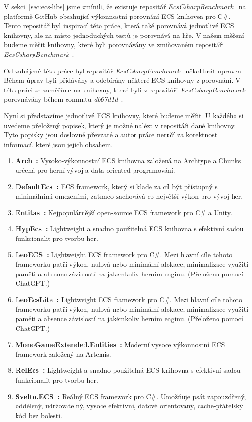 V sekci~\ref{sec:ecs-libs} jsme zmínili, že existuje repositář \textit{EcsCsharpBenchmark}~\cite{EcsCsharpBenchmark} na platformě GitHub obsahující výkonnostní porovnání ECS knihoven pro C\#. Tento repositář byl inspirací této práce, která také porovnává jednotlivé ECS knihovny, ale na místo jednoduchých testů je porovnává na hře. V našem měření budeme měřit knihovny, které byli porovnávány ve zmiňovaném repositáři \textit{EcsCsharpBenchmark}~\cite{EcsCsharpBenchmark}.

Od zahájené této práce byl repositář \textit{EcsCsharpBenchmark}~\cite{EcsCsharpBenchmark} několikrát upraven. Během úprav byli přidávány a odebírány některé ECS knihovny z porovnání. V této práci se zaměříme na knihovny, které byli v repositáři \textit{EcsCsharpBenchmark}~\cite{EcsCsharpBenchmark} porovnávány během commitu \textit{db67d1d}~\cite{EcsCsharpBenchmarkCommit}.

Nyní si představíme jednotlivé ECS knihovny, které budeme měřit. U každého si uvedeme přeložený popisek, který je možné nalézt v repositáři dané knihovny. Tyto popisky jsou doslovně převzaté a autor práce neručí za korektnost informací, které jsou jejich obsahem.

\begin{enumerate}
    \item \textbf{Arch~\cite{Arch}:} Vysoko-výkonnostní ECS knihovna založená na Archtype a Chunks určená pro herní vývoj a data-oriented programování.
    \item \textbf{DefaultEcs~\cite{DefaultEcs}:} ECS framework, který si klade za cíl být přístupný s minimálními omezeními, zatímco zachovává co největší výkon pro vývoj her.
    \item \textbf{Entitas~\cite{Entitas}:} Nejpopulárnější open-source ECS framework pro C\# a Unity.
    \item \textbf{HypEcs~\cite{HypEcs}:} Lightweight a snadno použitelná ECS knihovna s efektivní sadou funkcionalit pro tvorbu her.
    \item \textbf{LeoECS~\cite{LeoECS}:} Lightweight ECS framework pro C\#. Mezi hlavní cíle tohoto frameworku patří výkon, nulová nebo minimální alokace, minimalizace využití paměti a absence závislostí na jakémkoliv herním enginu. (Přeloženo pomocí ChatGPT.)
    \item \textbf{LeoEcsLite~\cite{LeoEcsLite}:} Lightweight ECS framework pro C\#. Mezi hlavní cíle tohoto frameworku patří výkon, nulová nebo minimální alokace, minimalizace využití paměti a absence závislostí na jakémkoliv herním enginu. (Přeloženo pomocí ChatGPT.)
    \item \textbf{MonoGameExtended.Entities~\cite{MonoGameExtended}:} Moderní vysoce výkonnostní ECS framework založený na Artemis.
    \item \textbf{RelEcs~\cite{RelEcs}:} Lightweight a snadno použitelná ECS knihovna s efektivní sadou funkcionalit pro tvorbu her.
    \item \textbf{Svelto.ECS~\cite{SveltoECS}:} Reálný ECS framework pro C\#. Umožňuje psát zapouzdřený, oddělený, udržovatelný, vysoce efektivní, datově orientovaný, cache-přátelský kód bez bolesti.
\end{enumerate}


